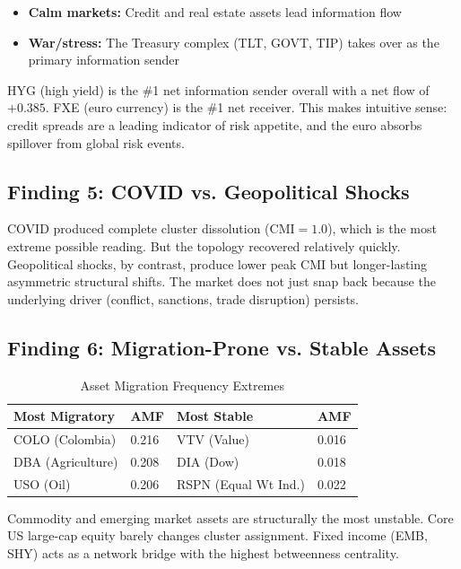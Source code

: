 \documentclass[12pt, letterpaper]{article}
\begin{document}
\begin{itemize}
    \item \textbf{Calm markets:} Credit and real estate assets lead information flow
    \item \textbf{War/stress:} The Treasury complex (TLT, GOVT, TIP) takes over as the primary information sender
\end{itemize}

HYG (high yield) is the \#1 net information sender overall with a net flow of $+0.385$. FXE (euro currency) is the \#1 net receiver. This makes intuitive sense: credit spreads are a leading indicator of risk appetite, and the euro absorbs spillover from global risk events.

\subsection{Finding 5: COVID vs. Geopolitical Shocks}

COVID produced complete cluster dissolution ($\text{CMI} = 1.0$), which is the most extreme possible reading. But the topology recovered relatively quickly. Geopolitical shocks, by contrast, produce lower peak CMI but longer-lasting asymmetric structural shifts. The market does not just snap back because the underlying driver (conflict, sanctions, trade disruption) persists.

\subsection{Finding 6: Migration-Prone vs. Stable Assets}

\begin{table}[H]
\centering
\caption{Asset Migration Frequency Extremes}
\begin{tabular}{@{}llll@{}}
\toprule
\textbf{Most Migratory} & \textbf{AMF} & \textbf{Most Stable} & \textbf{AMF} \\
\midrule
COLO (Colombia) & 0.216 & VTV (Value) & 0.016 \\
DBA (Agriculture) & 0.208 & DIA (Dow) & 0.018 \\
USO (Oil) & 0.206 & RSPN (Equal Wt Ind.) & 0.022 \\
\bottomrule
\end{tabular}
\end{table}

Commodity and emerging market assets are structurally the most unstable. Core US large-cap equity barely changes cluster assignment. Fixed income (EMB, SHY) acts as a network bridge with the highest betweenness centrality.
\end{document}
